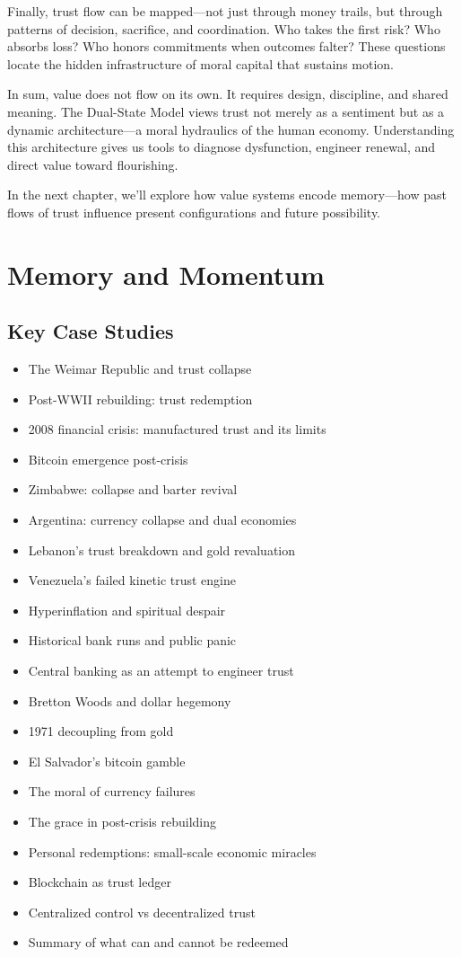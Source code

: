\documentclass[11pt,oneside]{book}
\begin{document}
Finally, trust flow can be mapped—not just through money trails, but through patterns of decision, sacrifice, and coordination. Who takes the first risk? Who absorbs loss? Who honors commitments when outcomes falter? These questions locate the hidden infrastructure of moral capital that sustains motion.

In sum, value does not flow on its own. It requires design, discipline, and shared meaning. The Dual-State Model views trust not merely as a sentiment but as a dynamic architecture—a moral hydraulics of the human economy. Understanding this architecture gives us tools to diagnose dysfunction, engineer renewal, and direct value toward flourishing.

In the next chapter, we’ll explore how value systems encode memory—how past flows of trust influence present configurations and future possibility.


\chapter{ Memory and Momentum}

\section{Key Case Studies}

\begin{itemize}
\item The Weimar Republic and trust collapse
\item Post-WWII rebuilding: trust redemption
\item 2008 financial crisis: manufactured trust and its limits
\item Bitcoin emergence post-crisis
\item Zimbabwe: collapse and barter revival
\item Argentina: currency collapse and dual economies
\item Lebanon's trust breakdown and gold revaluation
\item Venezuela's failed kinetic trust engine
\item Hyperinflation and spiritual despair
\item Historical bank runs and public panic
\item Central banking as an attempt to engineer trust
\item Bretton Woods and dollar hegemony
\item 1971 decoupling from gold
\item El Salvador's bitcoin gamble
\item The moral of currency failures
\item The grace in post-crisis rebuilding
\item Personal redemptions: small-scale economic miracles
\item Blockchain as trust ledger
\item Centralized control vs decentralized trust
\item Summary of what can and cannot be redeemed
\end{itemize}
\end{document}
